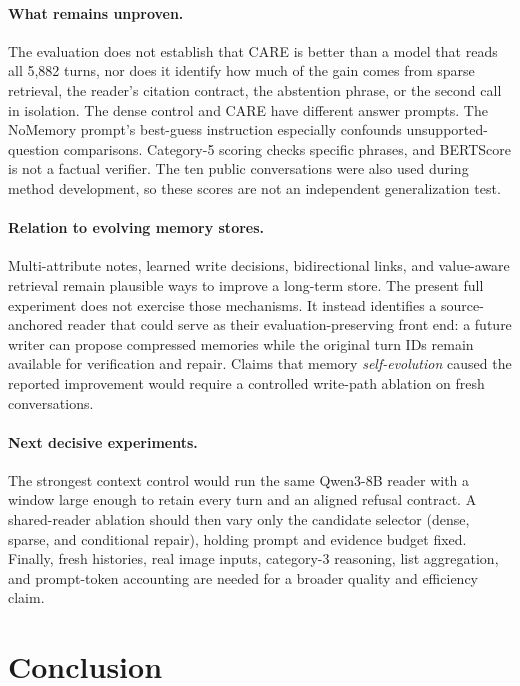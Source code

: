\documentclass[11pt]{article}
\newcommand{\care}{\textsc{CARE}}
\begin{document}
\paragraph{What remains unproven.}
The evaluation does not establish that \care{} is better than a model that
reads all 5,882 turns, nor does it identify how much of the gain comes from
sparse retrieval, the reader's citation contract, the abstention phrase,
or the second call in isolation. The dense control and \care{} have
different answer prompts. The NoMemory prompt's best-guess instruction
especially confounds unsupported-question comparisons. Category-5 scoring
checks specific phrases, and BERTScore is not a factual verifier. The ten
public conversations were also used during method development, so these
scores are not an independent generalization test.

\paragraph{Relation to evolving memory stores.}
Multi-attribute notes, learned write decisions, bidirectional links, and
value-aware retrieval remain plausible ways to
improve a long-term store. The present full experiment does not exercise
those mechanisms. It instead identifies a source-anchored reader that could
serve as their evaluation-preserving front end: a future writer can propose
compressed memories while the original turn IDs remain available for
verification and repair. Claims that memory \emph{self-evolution} caused
the reported improvement would require a controlled write-path ablation
on fresh conversations.

\paragraph{Next decisive experiments.}
The strongest context control would run the same Qwen3-8B reader with a
window large enough to retain every turn and an aligned refusal contract.
A shared-reader ablation should then vary only the candidate selector
(dense, sparse, and conditional repair), holding prompt and evidence
budget fixed. Finally, fresh histories, real image inputs, category-3
reasoning, list aggregation, and prompt-token accounting are needed for
a broader quality and efficiency claim.

\section{Conclusion}
\label{sec:conclusion}
\end{document}
